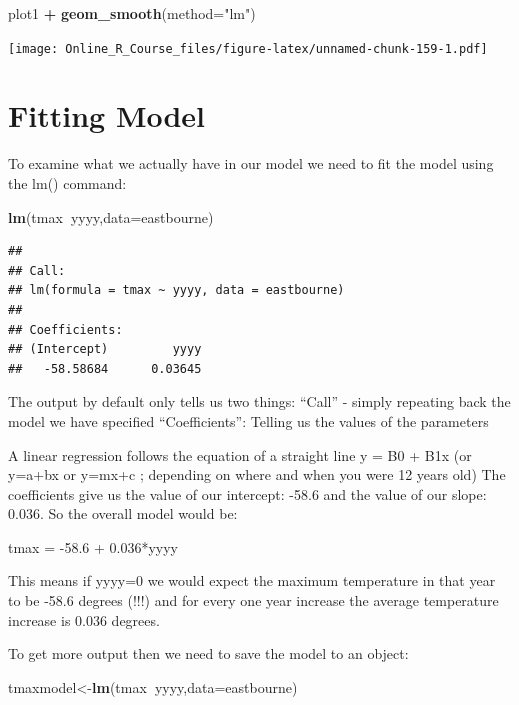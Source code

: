 \documentclass[]{book}
\newenvironment{Shaded}{\begin{snugshade}}{\end{snugshade}}
\newcommand{\DataTypeTok}[1]{\textcolor[rgb]{0.13,0.29,0.53}{#1}}
\newcommand{\KeywordTok}[1]{\textcolor[rgb]{0.13,0.29,0.53}{\textbf{#1}}}
\newcommand{\NormalTok}[1]{#1}
\newcommand{\OperatorTok}[1]{\textcolor[rgb]{0.81,0.36,0.00}{\textbf{#1}}}
\newcommand{\StringTok}[1]{\textcolor[rgb]{0.31,0.60,0.02}{#1}}
\begin{document}
\begin{Shaded}
\begin{Highlighting}[]
\NormalTok{plot1 }\OperatorTok{+}
\StringTok{    }\KeywordTok{geom_smooth}\NormalTok{(}\DataTypeTok{method=}\StringTok{"lm"}\NormalTok{)}
\end{Highlighting}
\end{Shaded}

\texttt{[image: Online\_R\_Course\_files/figure-latex/unnamed-chunk-159-1.pdf]}

\hypertarget{fitting-model}{%
\section{Fitting Model}\label{fitting-model}}

To examine what we actually have in our model we need to fit the model using the lm() command:

\begin{Shaded}
\begin{Highlighting}[]
\KeywordTok{lm}\NormalTok{(tmax}\OperatorTok{~}\NormalTok{yyyy,}\DataTypeTok{data=}\NormalTok{eastbourne)}
\end{Highlighting}
\end{Shaded}

\begin{verbatim}
## 
## Call:
## lm(formula = tmax ~ yyyy, data = eastbourne)
## 
## Coefficients:
## (Intercept)         yyyy  
##   -58.58684      0.03645
\end{verbatim}

The output by default only tells us two things:
``Call'' - simply repeating back the model we have specified
``Coefficients'': Telling us the values of the parameters

A linear regression follows the equation of a straight line y = B0 + B1x (or y=a+bx or y=mx+c ; depending on where and when you were 12 years old)
The coefficients give us the value of our intercept: -58.6 and the value of our slope: 0.036. So the overall model would be:

tmax = -58.6 + 0.036*yyyy

This means if yyyy=0 we would expect the maximum temperature in that year to be -58.6 degrees (!!!) and for every one year increase the average temperature increase is 0.036 degrees.

To get more output then we need to save the model to an object:

\begin{Shaded}
\begin{Highlighting}[]
\NormalTok{tmaxmodel<-}\KeywordTok{lm}\NormalTok{(tmax}\OperatorTok{~}\NormalTok{yyyy,}\DataTypeTok{data=}\NormalTok{eastbourne)}
\end{Highlighting}
\end{Shaded}
\end{document}
